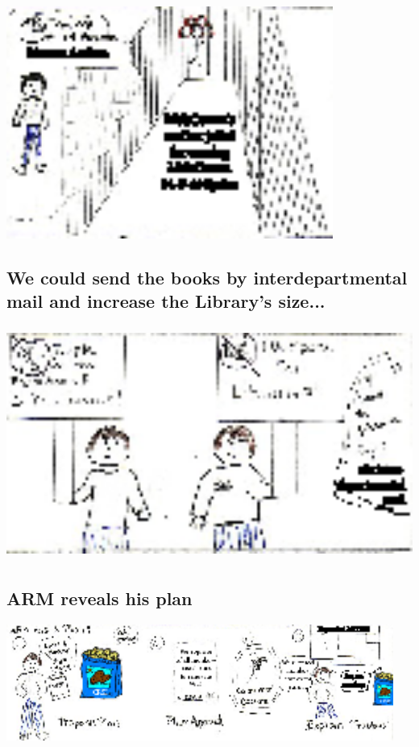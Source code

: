 \documentclass[10pt]{article}
\begin{document}
\includegraphics[height = 3in]{panel.2004-03-12.05.eps}

\subsection*{We could send the books by interdepartmental mail and
  increase the Library's size...}
\includegraphics[height = 3in]{panel.2004-03-12.06.eps}

\subsection*{ARM reveals his plan}
\includegraphics[width = 5in]{panel.2004-03-12.07.eps}
\end{document}
